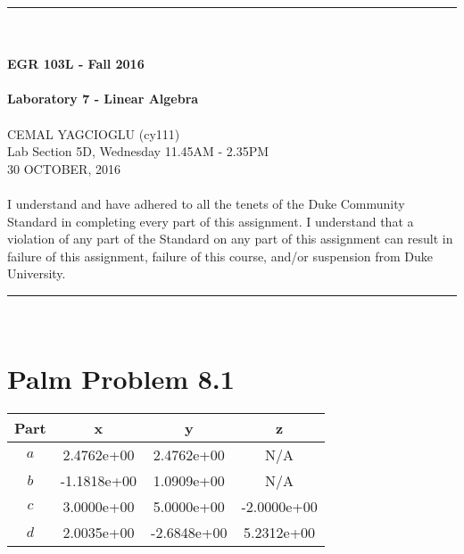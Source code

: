 \documentclass{article}
\begin{document}
\begin{center}
\rule{6.5in}{0.5mm}\\~\\
{\bf \large EGR 103L - Fall 2016}\\~\\
{\huge \bf Laboratory 7 - Linear Algebra}\\~\\
CEMAL YAGCIOGLU (cy111)\\
Lab Section 5D, Wednesday 11.45AM - 2.35PM\\
30 OCTOBER, 2016\\~\\
{\small  I understand and have adhered to all the tenets of the Duke
  Community Standard in completing every part of this assignment.  I
  understand that a violation of any part of the Standard on any part
  of this assignment can result in failure of this assignment, failure
  of this course, and/or suspension from Duke University.} 
\rule{6.5in}{0.5mm}\\
\end{center}
\tableofcontents
\listoffigures
\pagebreak
\section{Palm Problem 8.1}
\renewcommand{\arraystretch}{1.5}
\begin{center}
\begin{tabular}{|c||c|c|c|}\hline
Part & x & y & z \\ \hline \hline
$a$ & 2.4762e+00 & 2.4762e+00  & N/A\\ \hline
$b$ & -1.1818e+00 &  1.0909e+00 & N/A \\ \hline
$c$ & 3.0000e+00 & 5.0000e+00 & -2.0000e+00 \\ \hline
$d$ & 2.0035e+00 & -2.6848e+00  & 5.2312e+00 \\ \hline
\end{tabular}
\end{center}
\end{document}
